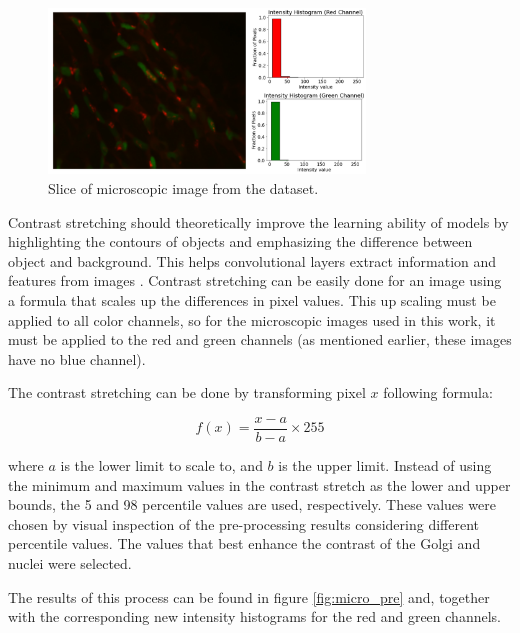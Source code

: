\begin{figure}[!htb]
  \centering
  \includegraphics[width=0.75\textwidth]{Images/img.jpg}
  \caption[Slice of microscopic image from the dataset.]{Slice of microscopic image from the dataset.}
  \label{fig:micro}
\end{figure}


Contrast stretching should theoretically improve the learning ability of models by highlighting the contours of objects and emphasizing the difference between object and background. This helps convolutional layers extract information and features from images \cite{contrast_strect}. Contrast stretching can be easily done for an image using a formula that scales up the differences in pixel values. This up scaling must be applied to all color channels, so for the microscopic images used in this work, it must be applied to the red and green channels (as mentioned earlier, these images have no blue channel).

The contrast stretching can be done by transforming pixel $x$ following formula:

\begin{equation}
    \label{eq:contrast}
    f(x) = \frac{x-a}{b-a} \times 255
\end{equation}


\noindent where $a$ is the lower limit to scale to, and $b$ is the upper limit. Instead of using the minimum and maximum values in the contrast stretch as the lower and upper bounds, the 5 and 98 percentile values are used, respectively. These values were chosen by visual inspection of the pre-processing results considering different percentile values. The values that best enhance the contrast of the Golgi and nuclei were selected.

The results of this process can be found in figure \ref{fig:micro_pre} and, together with the corresponding new intensity histograms for the red and green channels.

